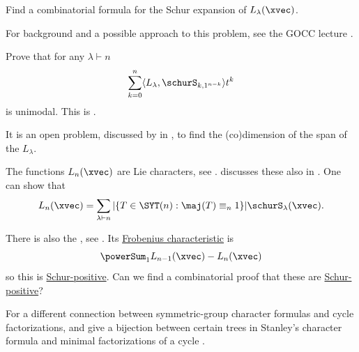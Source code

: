\begin{problem}
Find a combinatorial formula for the Schur expansion of $L_{\lambda}(\xvec)$.
\end{problem}
For background and a possible approach to this problem, see the GOCC lecture
\cite{GOCC2023ThrallProblem}.



\begin{problem}
Prove that for any $\lambda \vdash n$
\[
  \sum_{k=0}^n \langle L_{\lambda}, \schurS_{k,1^{n-k}} \rangle t^k
\]
is unimodal.  This is \cite[Conj.~7.13]{AdinHegedusRoichman2019x}.
\end{problem}


\begin{problem}
It is an open problem, discussed by  in
\cite{StanleyFPSAC2021}, to find the (co)dimension of the span of the
$L_\lambda$.
\end{problem}


The functions $L_{n}(\xvec)$ are Lie characters, see
\cite[Thm.~8.3]{Reutenauer1993}.
 discusses these also in \cite{StanleyWhitehouse}.
One can show that
\[
L_{n}(\xvec) = \sum_{\lambda \vdash n} |\{T \in \SYT(n) : \maj(T) \equiv_n 1\}| \schurS_\lambda(\xvec).
\]

There is also the \label{whitehouseModuleDefinition},
see \cite{StanleyWhitehouse}.
Its \hyperref[frobeniusCharacteristic]{Frobenius characteristic} is
\[
\powerSum_{1} L_{n-1}(\xvec) - L_{n}(\xvec)
\]
so this is \hyperref[schurPositivity]{Schur-positive}.
Can we find a combinatorial proof that these are \hyperref[schurPositivity]{Schur-positive}?


For a different connection between symmetric-group character formulas and
cycle factorizations,  and 
give a bijection between certain trees in Stanley's character formula and
minimal factorizations of a cycle \cite{TrokowskaSniady2024}.
